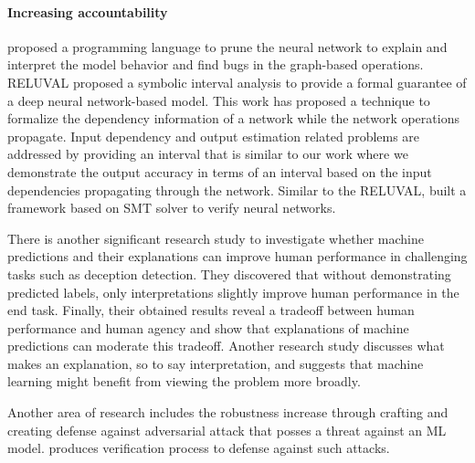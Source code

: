 \paragraph{Increasing accountability}
\cite{jia2019taso} proposed a programming language to prune the neural network to explain and interpret the model behavior and find bugs in the graph-based operations. RELUVAL \cite{wang2018formal} proposed a symbolic interval analysis to provide a formal guarantee of a deep neural network-based model. This work has proposed a technique to formalize the dependency information of a network while the network operations propagate. Input dependency and output estimation related problems are addressed by providing an interval that is similar to our work where we demonstrate the output accuracy in terms of an interval based on the input dependencies propagating through the network. Similar to the RELUVAL, \cite{katz2017reluplex} built a framework based on SMT solver to verify neural networks.

There is another significant research study \cite{lai2018human} to investigate whether machine predictions and their explanations can improve human performance in challenging tasks such as deception detection. They discovered that without demonstrating predicted labels, only interpretations slightly improve human performance in the end task. Finally, their obtained results reveal a tradeoff between human performance and human agency and show that explanations of machine predictions can moderate this tradeoff. Another research study \cite{yang2019learn} discusses what makes an explanation, so to say interpretation, and suggests that machine learning might benefit from viewing the problem more broadly.

Another area of research includes the robustness increase through crafting and creating defense against adversarial attack \cite{papernot2016towards}  that posses a threat against an ML model. \cite{anderson2019optimization,pan2019static} produces verification process to defense against such attacks.

